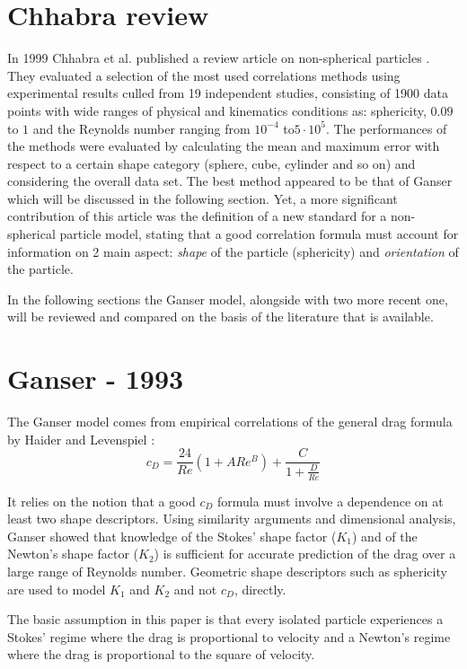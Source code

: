 	\section{Chhabra review}
		In 1999 Chhabra et al. published a review article on non-spherical particles \cite{ChhabraEtAl-1999}. They evaluated a selection of the most used correlations methods using experimental results culled from 19 independent studies, consisting of 1900 data points with wide ranges of physical and kinematics conditions as: sphericity, $ 0.09 $ to $ 1 $ and the Reynolds number ranging from $ 10^{-4} $ to$  5 \cdot 10^{5} $. The performances of the methods were evaluated by calculating the mean and maximum error with respect to a certain shape category (sphere, cube, cylinder and so on) and considering the overall data set. 
		The best method appeared to be that of Ganser \cite{Ganser-1993} which will be discussed in the following section.
		Yet, a more significant contribution of this article was the definition
		of a new standard for a non-spherical particle model, stating that a good correlation formula must account for information on 2 main aspect: \textit{shape} of the particle (sphericity) and \textit{orientation} of the particle. 
		
		In the following sections the Ganser model, alongside with two more recent one, will be reviewed and compared on the basis of the literature that is available. 
		
	\section{Ganser - 1993}
		The Ganser model \cite{Ganser-1993} comes from empirical correlations of the general drag formula by Haider and Levenspiel \cite{HaiderLevenspiel-1989}:
		\begin{equation}
			c_D = \frac{24}{Re} (1 + A Re^B) + \dfrac{C}{1 + \frac{D}{Re}}
		\end{equation}
	
		It relies on the notion that a good $ c_D $ formula must involve a dependence on at least two shape descriptors. Using similarity arguments and dimensional analysis, Ganser showed that knowledge of the Stokes' shape factor ($ K_1 $) and of the Newton's shape factor ($ K_2 $) is sufficient for accurate prediction of the drag over a large range of Reynolds number. 
		Geometric shape descriptors such as sphericity are used	to model $ K_1 $ and $ K_2 $ and not $ c_D $, directly.
		
		The basic assumption in this paper is that every isolated particle experiences a Stokes’ regime where the drag is proportional to velocity and a Newton’s regime where the drag is proportional to the square of velocity. 
		
